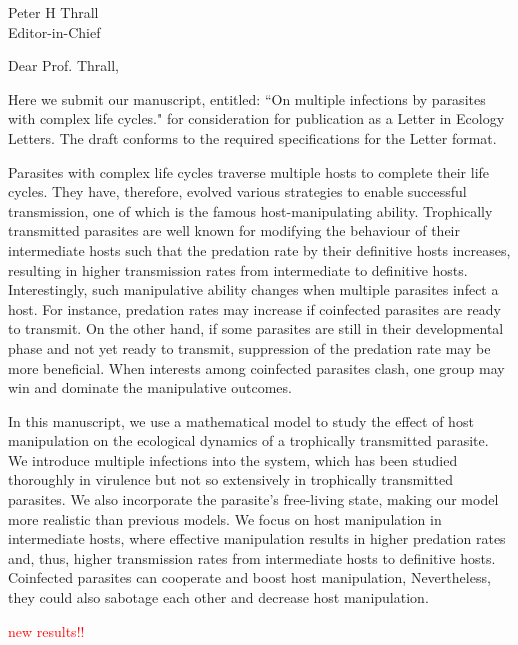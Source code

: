 \documentclass[10,DIN, pagenumber=false, parskip=half,fromalign=right, fromphone=false,fromemail=false, fromurl=false,fromlogo=true, fromrule=false]{scrlttr2}
\begin{document}
\sffamily

\begin{letter}{
\sffamily
\vspace{-0.4cm}
Peter H Thrall\\
Editor-in-Chief
}
\opening{\sffamily \vspace{-1cm} Dear Prof. Thrall,}
\vspace{-0.3cm}

Here we submit our manuscript, entitled: ``On multiple infections by parasites with complex life cycles." for consideration for publication as a Letter in Ecology Letters. 
The draft conforms to the required specifications for the Letter format.

Parasites with complex life cycles traverse multiple hosts to complete their life cycles.
They have, therefore, evolved various strategies to enable successful transmission, one of which is the famous host-manipulating ability.
Trophically transmitted parasites are well known for modifying the behaviour of their intermediate hosts such that the predation rate by their definitive hosts increases, resulting in higher transmission rates from intermediate to definitive hosts.
Interestingly, such manipulative ability changes when multiple parasites infect a host. 
For instance, predation rates may increase if coinfected parasites are ready to transmit. 
On the other hand, if some parasites are still in their developmental phase and not yet ready to transmit, suppression of the predation rate may be more beneficial.
When interests among coinfected parasites clash, one group may win and dominate the manipulative outcomes.

In this manuscript, we use a mathematical model to study the effect of host manipulation on the ecological dynamics of a trophically transmitted parasite.
We introduce multiple infections into the system, which has been studied thoroughly in virulence but not so extensively in trophically transmitted parasites.
We also incorporate the parasite's free-living state, making our model more realistic than previous models.
We focus on host manipulation in intermediate hosts, where effective manipulation results in higher predation rates and, thus, higher transmission rates from intermediate hosts to definitive hosts.
Coinfected parasites can cooperate and boost host manipulation,
Nevertheless, they could also sabotage each other and decrease host manipulation.

\textcolor{red}{new results!!}


\end{letter}
\end{document}
